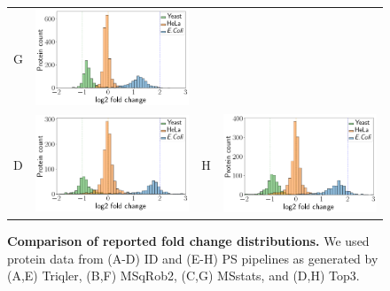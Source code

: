 \documentclass[11pt]{article}
\begin{document}
\begin{figure}[hbt]
\begin{tabular}{lclc}
        G & \includegraphics[width=0.4\linewidth]{../../result/report_plots_pipeline/histogram_PS_msstats.png} \\ 
        D & \includegraphics[width=0.4\linewidth]{../../result/report_plots_pipeline/histogram_ID_top3.png} &
        H & \includegraphics[width=0.4\linewidth]{../../result/report_plots_pipeline/histogram_PS_top3.png} 
    \end{tabular}
    \caption{{\bf Comparison of reported fold change distributions.} We used protein data from (A-D) ID and (E-H) PS pipelines as generated by 
    (A,E) Triqler, (B,F) MSqRob2, (C,G) MSstats, and (D,H) Top3. \label{fig:fc_histogram_supplement}}
\end{figure}
\end{document}
